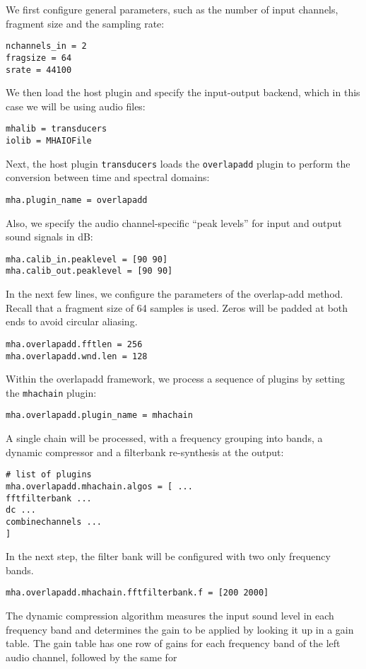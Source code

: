 We first configure general parameters, such as the number of input 
channels, fragment size and the sampling rate:
\begin{verbatim}
nchannels_in = 2
fragsize = 64
srate = 44100
\end{verbatim}
%
We then load the host plugin and specify the input-output backend, which 
in this case we will be using audio files:
\begin{verbatim}
mhalib = transducers
iolib = MHAIOFile
\end{verbatim}
%
Next, the host plugin \verb!transducers! loads the \verb!overlapadd! plugin 
to perform the conversion between time and spectral domains:
\begin{verbatim}
mha.plugin_name = overlapadd
\end{verbatim}
%
Also, we specify the audio channel-specific ``peak levels'' for input and output sound 
signals in dB:
\begin{verbatim}
mha.calib_in.peaklevel = [90 90]
mha.calib_out.peaklevel = [90 90]
\end{verbatim}
In the next few lines, we configure the parameters of the overlap-add
method. Recall that a fragment size of 64 samples is used. Zeros will be padded
at both ends to avoid circular aliasing.
\begin{verbatim}
mha.overlapadd.fftlen = 256
mha.overlapadd.wnd.len = 128
\end{verbatim}
%
Within the overlapadd framework, we process a sequence of plugins
by setting the \verb!mhachain! plugin:
\begin{verbatim}
mha.overlapadd.plugin_name = mhachain
\end{verbatim}
%
A single chain will be processed, with a frequency grouping into bands, a dynamic 
compressor and a filterbank re-synthesis at the output:
\begin{verbatim}
# list of plugins
mha.overlapadd.mhachain.algos = [ ... 
fftfilterbank ... 
dc ... 
combinechannels ...
]
\end{verbatim}
In the next step, the filter bank will be configured with two only 
frequency bands. 
\begin{verbatim}
mha.overlapadd.mhachain.fftfilterbank.f = [200 2000]
\end{verbatim}
%
The dynamic compression algorithm measures the input sound level in 
each frequency band and determines the gain to be applied by looking 
it up in a gain table. The gain table has one row of gains for each 
frequency band of the left audio channel, followed by the same for 

